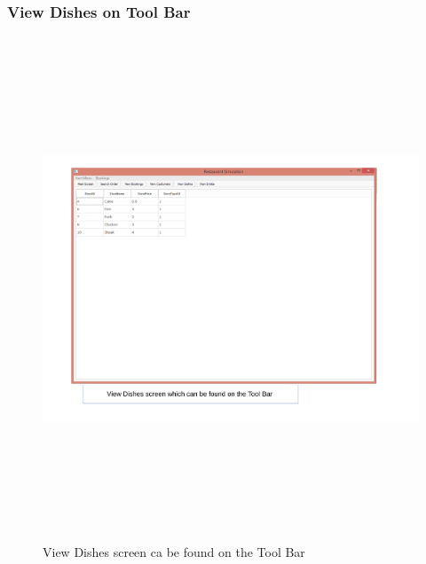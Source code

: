 \begin{landscape}
\subsubsection{View Dishes on Tool Bar}
\begin{figure}[H]
    \includegraphics[height = 15cm]{./Maintenance/images/screen20}
    \caption{View Dishes screen ca be found on the Tool Bar} \label{fig:screen20}
\end{figure}


\end{landscape}
